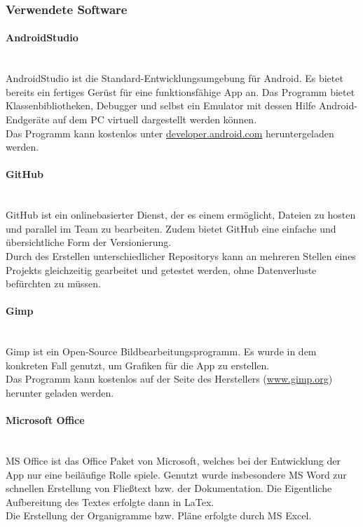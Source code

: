 \subsubsection{Verwendete Software}
\paragraph{AndroidStudio}
\ \\[1em]
AndroidStudio ist die Standard-Entwicklungsumgebung für Android. Es bietet bereits ein fertiges Gerüst für eine funktionsfähige App an. Das Programm bietet Klassenbibliotheken, Debugger und selbst ein Emulator mit dessen Hilfe Android-Endgeräte auf dem PC virtuell dargestellt werden können.\\
Das Programm kann kostenlos unter \href{https://developer.android.com/sdk/index.html}{developer.android.com} heruntergeladen werden.



\paragraph{GitHub}
\ \\[1em]
GitHub ist ein onlinebasierter Dienst, der es einem ermöglicht, Dateien zu hosten und parallel im Team zu bearbeiten. Zudem bietet GitHub eine einfache und übersichtliche Form der Versionierung.\\
Durch des Erstellen unterschiedlicher Repositorys kann an mehreren Stellen eines Projekts gleichzeitig gearbeitet und getestet werden, ohne Datenverluste befürchten zu müssen.

\paragraph{Gimp}
\ \\[1em]
Gimp ist ein Open-Source Bildbearbeitungsprogramm. Es wurde in dem konkreten Fall genutzt, um Grafiken für die App zu erstellen.\\
Das Programm kann kostenlos auf der Seite des Herstellers  (\href{http://www.gimp.org/downloads/}{www.gimp.org}) herunter geladen werden.

\paragraph{Microsoft Office}
\ \\[1em]
MS Office ist das Office Paket von Microsoft, welches bei der Entwicklung der App nur eine beiläufige Rolle spiele. Genutzt wurde insbesondere MS Word zur schnellen Erstellung von Fließtext bzw. der Dokumentation. Die Eigentliche Aufbereitung des Textes erfolgte dann in LaTex.\\
Die Erstellung der Organigramme bzw. Pläne erfolgte durch MS Excel.


